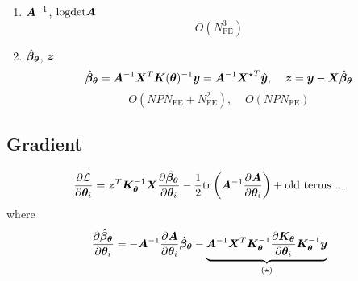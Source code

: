 \documentclass[10pt]{scrartcl}
\begin{document}
\begin{enumerate}
\item{$\bm{A}^{-1}$, $\text{logdet}\bm{A}$
\begin{equation}
O(N_\text{FE}^3)
\end{equation}
}

\item{$\hat{\bm{\beta}}_{\bm{\theta}}$, $\bm{z}$
\begin{equation}
\hat{\bm{\beta}}_{\bm{\theta}} = \bm{A}^{-1}\bm{X}^T\bm{K}(\bm{\theta})^{-1}\bm{y}=\bm{A}^{-1}{\bm{X}^\star}^T\hat{\bm{y}},\;\;\;\;\bm{z}=\bm{y}-\bm{X}\hat{\bm{\beta}}_{\bm{\theta}}
\end{equation}
\begin{equation}
O(NPN_\text{FE}+N_\text{FE}^2),\;\;\;\;O(NPN_\text{FE})
\end{equation}
}

\end{enumerate}

\subsection{Gradient}

\begin{align}
\frac{\partial{\mathcal{L}}}{\partial\bm{\theta}_i} =
\bm{z}^T\bm{K}_{\bm{\theta}}^{-1}\bm{X}\frac{\partial{\hat{\bm{\beta}}_{\bm{\theta}}}}{\partial\bm{\theta}_i}
-\frac{1}{2}\text{tr}\left(\bm{A}^{-1}\frac{\partial{\bm{A}}}{\partial\bm{\theta}_i}\right)+\text{old terms ...}
\end{align}
where
\begin{equation}
\frac{\partial{\hat{\bm{\beta}}_{\bm{\theta}}}}{\partial\bm{\theta}_i} =
-\bm{A}^{-1}\frac{\partial{\bm{A}}}{\partial\bm{\theta}_i}\hat{\bm{\beta}}_{\bm{\theta}}
-
\underbrace{
\bm{A}^{-1}\bm{X}^T\bm{K}_{\bm{\theta}}^{-1}\frac{\partial{\bm{K}_{\bm{\theta}}}}{\partial\bm{\theta}_i}\bm{K}_{\bm{\theta}}^{-1}\bm{y}
}_{(\star)}
\end{equation}
\end{document}
